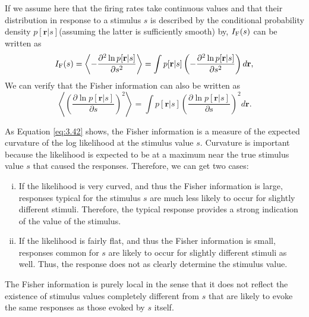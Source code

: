 \begin{prop}
  If we assume here that the firing rates take continuous values and
  that their distribution in response to a stimulus $s$ is described
  by the conditional probability density $p[\mathbf{r}|s]$(assuming
  the latter is sufficiently smooth) by, $I_{\rm{F}}(s)$ can be written as
\begin{equation}
  \label{eq:3.42}
  I_{\rm{F}}(s)=\left\langle
    -\frac{\partial^{2}\ln p[\mathbf{r}|s]}{\partial s^{2}}
  \right\rangle=\int p[\mathbf{r}|s]\left( -\frac{\partial^{2}\ln p[\mathbf{r}|s]}{\partial s^{2}} \right)d\mathbf{r},
\end{equation}
We can verify that the Fisher information can also be written as
\begin{equation}
  \label{eq:3.43}
  \left\langle \left( \frac{\partial\ln p[\mathbf{r}|s]}{\partial s} \right)^{2}
  \right\rangle=\int p[\mathbf{r}|s]\left( \frac{\partial\ln p[\mathbf{r}|s]}{\partial s} \right)^{2}d\mathbf{r}.
\end{equation}
\end{prop}

\begin{rem}
  As Equation \ref{eq:3.42} shows, the Fisher information is a measure of the expected curvature of the log likelihood at the stimulus value
$s$. Curvature is important because the likelihood is expected to be at
a maximum near the true stimulus value $s$ that caused the
responses. Therefore, we can get two cases:
\begin{enumerate}[(i)]
\item If the likelihood is very curved, and thus the Fisher information is
large, responses typical for the stimulus $s$ are much less likely to
occur for slightly different stimuli. Therefore, the typical response
provides a strong indication of the value of the stimulus.
\item If the
likelihood is fairly flat, and thus the Fisher information is small,
responses common for $s$ are likely to occur for slightly different
stimuli as well. Thus, the response does not as clearly determine the stimulus value.
\end{enumerate}
\end{rem}

\begin{rem}
  The Fisher information is purely local in the sense that it
does not reflect the existence of stimulus values completely different from
$s$ that are likely to evoke the same responses as those evoked by $s$ itself.
\end{rem}

